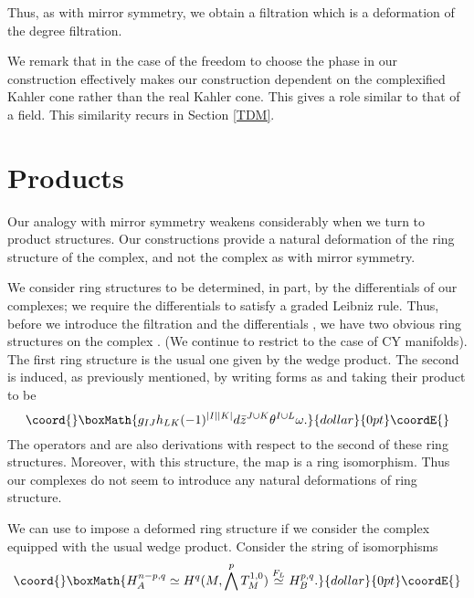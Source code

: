 \documentclass[a4paper,11pt]{amsart}
\providecommand{\db}{\bar{\partial}}
\begin{document}
Thus, as with mirror symmetry, we obtain a filtration which is a deformation of
the degree filtration. 

We remark that in the case of \coordHE{} the freedom to choose the phase
 \coordHE{} in our construction effectively makes our construction dependent on the 
 complexified Kahler cone rather than the real Kahler cone. This gives \coordHE{} a
 role similar to that of a \coordHE{} field. This similarity recurs in Section \ref{TDM}. 
 

\section{Products}

 Our analogy with mirror symmetry weakens considerably when we turn to product
  structures. Our constructions 
 provide a natural deformation of the ring structure of the \coordHE{} complex, and not the \coordHE{} complex as with
  mirror symmetry. 
  
We consider ring structures to be determined, in part, by the differentials of
 our complexes; we require the differentials to satisfy a graded Leibniz rule. 
 Thus, before we introduce the filtration \coordHE{} and the differentials 
 \coordHE{}, we have two obvious ring structures on the
  complex \myHighlight{$(B^{\cdot},\db)$}\coordHE{}. (We continue to restrict to the case of CY 
  manifolds). The first ring structure 
is the usual one given by the wedge product. The second is induced, as
 previously mentioned, by writing forms as 
 \coordHE{} and \coordHE{} 
 taking their product to be 
 $$\coord{}\boxMath{g_{IJ}h_{LK}(-1)^{|I||K|}d\bar z^{J\cup K}\theta^{I\cup L}\omega.}{dollar}{0pt}\coordE{}$$
 The operators \coordHE{} and \coordHE{} are also derivations with respect to the second of
  these ring structures. Moreover, with this structure, 
the map \coordHE{} is a ring
isomorphism. Thus our complexes do not seem to introduce any natural
 deformations of ring structure.

 
 
  We can use \coordHE{} to impose a deformed ring structure if we consider the \coordHE{}
 complex equipped with the usual wedge product. Consider the string of
  isomorphisms 
  $$\coord{}\boxMath{H_A^{n-p,q}\simeq H^q(M,\bigwedge^pT_M^{1,0})\stackrel{F_L}{\simeq}
  H_B^{p,q}.}{dollar}{0pt}\coordE{}$$
  
\end{document}
